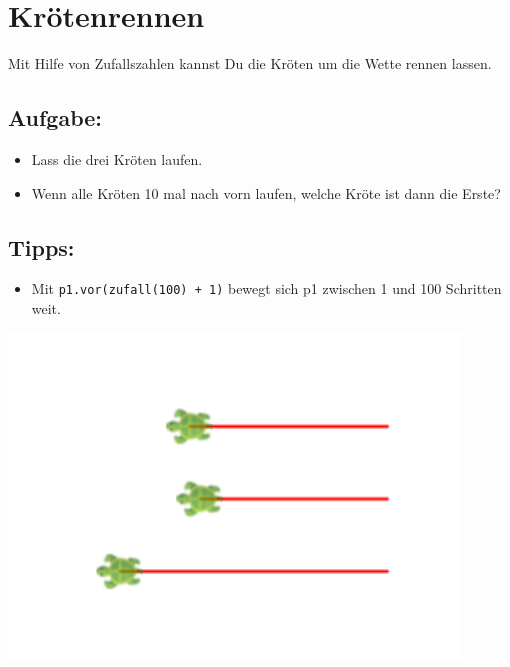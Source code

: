 \chapter{Krötenrennen}
\begin{multicols}{2}
Mit Hilfe von Zufallszahlen kannst Du die Kröten um die Wette rennen lassen.
\section*{\color{BrickRed}Aufgabe:}


\begin{itemize}

\item {Lass die drei Kröten laufen.}
\item {Wenn alle Kröten 10 mal nach vorn laufen, welche Kröte ist dann die Erste?}

\end{itemize}


\section*{\color{OliveGreen}Tipps:}


\begin{itemize}

\item {Mit \lstinline{p1.vor(zufall(100) + 1)} bewegt sich p1 zwischen 1 und 100 Schritten weit.}

\end{itemize}



\columnbreak

\begin{center}
\includegraphics[width=12.0cm]{../img/race.png}
\end{center}

\end{multicols}

